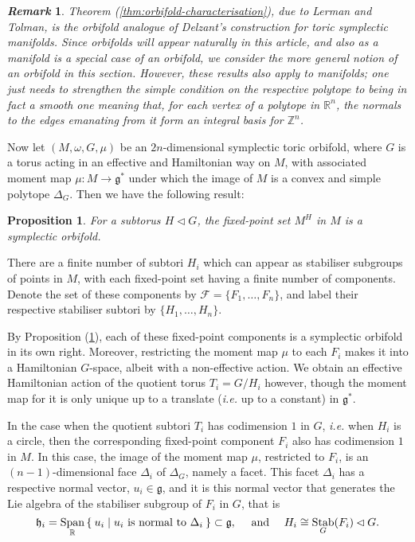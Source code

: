 \documentclass{amsart}
\newtheorem{prop}[theorem]{Proposition}
\newtheorem{remark}{\it Remark\/}
\newcommand{\ie}{\emph{i.e.} }
\newcommand{\ra}{\rightarrow}
\newcommand{\w}{\omega}
\newcommand{\RR}{\mathbb{R}}
\newcommand{\ZZ}{\mathbb{Z}}
\newcommand{\mcF}{\mathcal{F}}
\newcommand{\mfg}{\mathfrak{g}}
\newcommand{\mfh}{\mathfrak{h}}
\DeclareMathOperator{\Span}{Span}
\DeclareMathOperator{\Stab}{Stab}
\begin{document}
	\begin{remark}
		Theorem (\ref{thm:orbifold-characterisation}), due to Lerman and Tolman, is the orbifold analogue of Delzant's construction for toric symplectic manifolds. Since orbifolds will appear naturally in this article, and also as a manifold is a special case of an orbifold, we consider the more general notion of an orbifold in this section. However, these results also apply to manifolds; one just needs to strengthen the simple condition on the respective polytope to being in fact a \emph{smooth} one meaning that, for each vertex of a polytope in $\RR^{n}$, the normals to the edges emanating from it form an integral basis for $\ZZ^{n}$.
	\end{remark}
	
	Now let $(M, \w, G, \mu)$ be an $2n$-dimensional symplectic toric orbifold, where $G$ is a torus acting in an effective and Hamiltonian way on $M$, with associated moment map $\mu : M \ra \mfg^{\ast}$ under which the image of $M$ is a convex and simple polytope $\Delta_{G}$. Then we have the following result:
	
	\begin{prop}\label{thm:fixed-point-suborbifold}
		For a subtorus $H \lhd G$, the fixed-point set $M^{H}$ in $M$ is a symplectic orbifold.
	\end{prop}
	
    There are a finite number of subtori $H_{i}$ which can appear as stabiliser subgroups of points in $M$, with each fixed-point set having a finite number of components. Denote the set of these components by $\mcF = \{F_{1}, \ldots, F_{n} \}$, and label their respective stabiliser subtori by $\{H_{1}, \ldots, H_{n}\}$.
    
    By Proposition (\ref{thm:fixed-point-suborbifold}), each of these fixed-point components is a symplectic orbifold in its own right. Moreover, restricting the moment map $\mu$ to each $F_{i}$ makes it into a Hamiltonian $G$-space, albeit with a non-effective action. We obtain an effective Hamiltonian action of the quotient torus $T_{i} = G/H_{i}$ however, though the moment map for it is only unique up to a translate (\ie up to a constant) in $\mfg^{\ast}$.
    
    In the case when the quotient subtori $T_{i}$ has codimension $1$ in $G$, \ie when $H_{i}$ is a circle, then the corresponding fixed-point component $F_{i}$ also has codimension $1$ in $M$. In this case, the image of the moment map $\mu$, restricted to $F_{i}$, is an $(n-1)$-dimensional face $\Delta_{i}$ of $\Delta_{G}$, namely a facet. This facet $\Delta_{i}$ has a respective normal vector, $u_{i} \in \mfg$, and it is this normal vector that generates the Lie algebra of the stabiliser subgroup of $F_{i}$ in $G$, that is
    \[
    	\mfh_{i} = \Span_{\RR}\Set{u_{i} | u_{i} \text{ is normal to } \Delta_{i}} \subset \mfg, \quad \text{ and } \quad H_{i} \cong \Stab_{G}(F_{i}) \lhd G.
    \]
    
\end{document}
